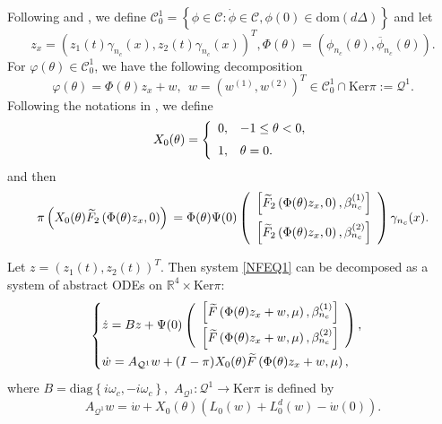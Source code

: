 \documentclass[11pt]{article}
\theoremstyle{definition}
\theoremstyle{remark}
\numberwithin{equation}{section}
\begin{document}
Following \cite{Faria-00TAMS}  and \cite{Song-ZP-16CNSNS}, we
define $\mathscr{C}_0^1=\left\{ \phi\in \mathscr{C}: \dot{\phi}\in \mathscr{C}, \phi (0)\in \mbox{dom}(d\Delta)\right\}$ and let
$$z_x=\left(z_1(t)\gamma_{n_c}(x), z_2(t)\gamma_{n_c}(x)\right)^T, \Phi(\theta)=\left(\phi_{n_c}(\theta), \overline{\phi}_{n_c}(\theta)\right).
$$
For  $\varphi (\theta)\in \mathscr{C}_0^1$,   we have the following decomposition
$$
\varphi(\theta)=\Phi(\theta) z_x+w,  ~~w=(w^{(1)}, w^{(2)})^T\in \mathscr{C}_0^1\cap \mbox{Ker}\pi:=\mathscr{Q}^1.
$$
Following the notations in \cite{Faria-00TAMS}, we define
$$X_0(\theta)=\left\{
\begin{array}{ll}
0, & -1\leq \theta <0,\vspace{0.2cm}\\
1, & \theta=0.
\end{array}\right.
$$
and then
\begin{equation}
\label{PIX0}
  \pi\left(X_0(\theta)\widetilde{F}_2\left(\Phi(\theta) z_x,0\right)\right)\vspace{0.2cm}\\
=
\Phi (\theta)\Psi (0)\left(\begin{array}{c}\left[\widetilde{F}_2\left(\Phi(\theta) z_x,0\right),\beta_{n_c}^{(1)}\right]\vspace{0.2cm}\\
\left[\widetilde{F}_2\left(\Phi(\theta) z_x,0\right),\beta_{n_c}^{(2)}\right]
\end{array}\right)\gamma_{n_c}(x).
\end{equation}

Let $z=(z_1(t),  z_2(t))^T.$ Then system \eqref{NFEQ1} can be decomposed as a system of abstract
ODEs on $\mathbb{R}^4\times \mbox{Ker}\pi$:
\begin{equation}
\label{AODE}
\begin{cases}
\dot{z}=Bz+\Psi(0)\left(\begin{array}{c}\left[\widetilde{F}\left(\Phi(\theta) z_x+w,\mu\right),\beta_{n_c}^{(1)}\right]\vspace{0.1cm}\\
\left[\widetilde{F}\left(\Phi(\theta) z_x+w,\mu\right),\beta_{n_c}^{(2)}\right]
\end{array}\right),\vspace{0.1cm}\\
\dot{w}=A_{\mathcal{Q}^1}w+(I-\pi)X_0(\theta)\widetilde{F}\left(\Phi(\theta) z_x+w,\mu\right),
\end{cases}
\end{equation}
where
$B=\mbox{diag}\left\{i\omega_c, -i\omega_c  \right\},$
$A_{\mathcal{Q}^1}: \mathcal{Q}^1\rightarrow \mbox{Ker}\pi$ is defined by
$$A_{\mathscr{Q}^1} w=\dot{w}+ X_0(\theta) \left(L_0(w)+L_0^d(w)-\dot{w}(0) \right).$$
\end{document}
